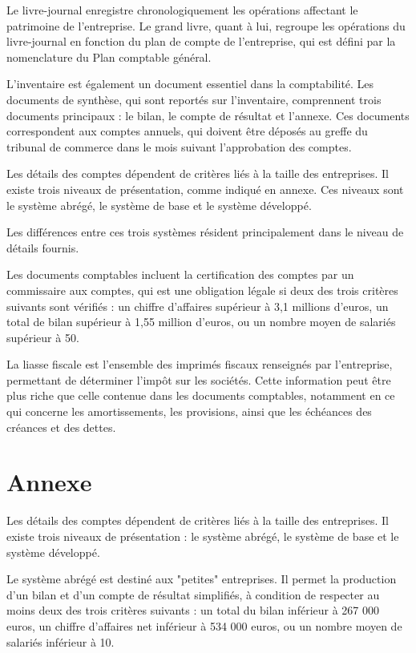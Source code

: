 \documentclass[a4paper, 12pt]{report}
\begin{document}
Le livre-journal enregistre chronologiquement les opérations affectant le patrimoine de l'entreprise. Le grand livre, quant à lui, regroupe les opérations du livre-journal en fonction du plan de compte de l'entreprise, qui est défini par la nomenclature du Plan comptable général.

L'inventaire est également un document essentiel dans la comptabilité. Les documents de synthèse, qui sont reportés sur l'inventaire, comprennent trois documents principaux : le bilan, le compte de résultat et l'annexe. Ces documents correspondent aux comptes annuels, qui doivent être déposés au greffe du tribunal de commerce dans le mois suivant l'approbation des comptes.

Les détails des comptes dépendent de critères liés à la taille des entreprises. Il existe trois niveaux de présentation, comme indiqué en annexe. Ces niveaux sont le système abrégé, le système de base et le système développé. 

Les différences entre ces trois systèmes résident principalement dans le niveau de détails fournis. 

Les documents comptables incluent la certification des comptes par un commissaire aux comptes, qui est une obligation légale si deux des trois critères suivants sont vérifiés : un chiffre d'affaires supérieur à 3,1 millions d'euros, un total de bilan supérieur à 1,55 million d'euros, ou un nombre moyen de salariés supérieur à 50.

La liasse fiscale est l'ensemble des imprimés fiscaux renseignés par l'entreprise, permettant de déterminer l'impôt sur les sociétés. Cette information peut être plus riche que celle contenue dans les documents comptables, notamment en ce qui concerne les amortissements, les provisions, ainsi que les échéances des créances et des dettes.

\section{Annexe}

Les détails des comptes dépendent de critères liés à la taille des entreprises. Il existe trois niveaux de présentation : le système abrégé, le système de base et le système développé.

Le système abrégé est destiné aux "petites" entreprises. Il permet la production d'un bilan et d'un compte de résultat simplifiés, à condition de respecter au moins deux des trois critères suivants : un total du bilan inférieur à 267 000 euros, un chiffre d'affaires net inférieur à 534 000 euros, ou un nombre moyen de salariés inférieur à 10.
\end{document}
